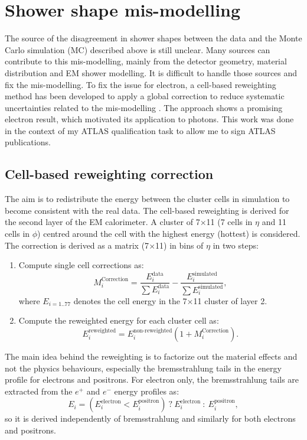 \section{Shower shape mis-modelling}
\label{gamma:ss}
The source of the disagreement in shower shapes between the data and the Monte Carlo simulation (MC) described above is still unclear. Many sources can contribute to this mis-modelling, mainly from the detector geometry, material distribution and EM shower modelling. It is difficult to handle those sources and fix the mis-modelling. To fix the issue for electron, a cell-based reweighting method has been developed to apply a global correction to reduce systematic uncertainties related to the mis-modelling \cite{xu, khandoga}. The approach shows a promising electron result, which motivated its application to photons. This work was done in the context of my ATLAS qualification task to allow me to sign ATLAS publications.

\subsection{Cell-based reweighting correction}
\label{gamma:ss:reweighting}
The aim is to redistribute the energy between the cluster cells in simulation to become consistent with the real data. The cell-based reweighting is derived for the second layer of the EM calorimeter. A cluster of 7$\times$11 (7 cells in $\eta$ and 11 cells in $\phi$) centred around the cell with the highest energy (hottest) is considered. The correction is derived as a matrix (7$\times$11) in bins of $\eta$ in two steps:
\begin{enumerate}
    \item Compute single cell corrections as: 
    \begin{equation}
        M_{i}^{\text{Correction}} = \frac{E_{i}^{\text{data}}}{\sum E_{i}^{\text{data}}} -  \frac{E_{i}^{\text{simulated}}}{\sum E_{i}^{\text{simulated}}},
    \end{equation}
    where $E_{i = 1 .. 77}$ denotes the cell energy in the 7$\times$11 cluster of layer 2. 
    \item Compute the reweighted energy for each cluster cell as: 
    \begin{equation}
        E_{i}^{\text{reweighted}} = E_{i}^{\text{non-reweighted}}(1+M_{i}^{\text{Correction}}).
    \end{equation}
\end{enumerate}
The main idea behind the reweighting is to factorize out the material effects and not the physics behaviours, especially the bremsstrahlung tails in the energy profile for electrons and positrons. For electron only, the bremsstrahlung tails are extracted from the $e^+$ and $e^-$ energy profiles as: 
\begin{equation}
    E_{i} = (E_{i}^{\text{electron}} <  E_{i}^{\text{positron}}) \ ? \ E_{i}^{\text{electron}} \ : \  E_{i}^{\text{positron}},
\end{equation}
so it is derived independently of bremsstrahlung and similarly for both electrons and positrons.

